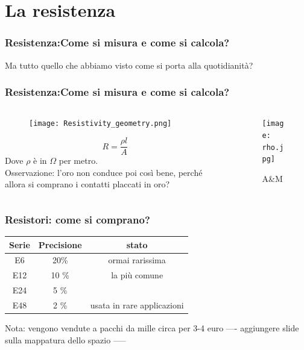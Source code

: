 
	\section{La resistenza} %
	\label{sec:la_resistenza}
		\begin{frame}[c]\frametitle{Resistenza:Come si misura e come si calcola?}
		    Ma tutto quello che abbiamo visto come si porta alla quotidianità?			
		\end{frame}
		\begin{frame}[c]\frametitle{Resistenza:Come si misura e come si calcola?}
		    \begin{columns}
		    	\begin{column}{0.4\textwidth}
		    		\begin{figure}[tb]
		    			\centering
		    			\texttt{[image: Resistivity\_geometry.png]}
		    			\label{fig:resistenza_resistivita}
		    		\end{figure}
		    		\[
		    		 R = \frac{\rho l}{A}
		    		\]
		    		Dove $\rho$ è in $\Omega$ per metro.\\
		    		\scriptsize{Osservazione: l'oro non conduce poi così bene, perché allora si comprano i contatti placcati in oro?}
		    	\end{column}
		    	\begin{column}{0.8\textwidth}
		    		\begin{figure}[tb]
		    			\centering
		    			\texttt{[image: rho.jpg]}
		    			\caption{A\&M}
		    			\label{fig:resistivita}
		    		\end{figure}
		    	\end{column}
		    \end{columns}	
		\end{frame}

		\begin{frame}[c]\frametitle{Resistori: come si comprano?}
		    \centering
		\begin{tabular}{c|c|c}
		Serie & Precisione & stato \\
		\hline
		E6	& 20\% & ormai rarissima  \\
		E12	& 10 \% & la più comune  \\
		E24	& 5  \% \\
		E48	& 2  \% & usata in rare applicazioni \\
		\end{tabular}
		
		\bigskip
		
		Nota: vengono vendute a pacchi da mille circa per 3-4 euro
		---- aggiungere slide sulla mappatura dello spazio -----
		
		\end{frame}

